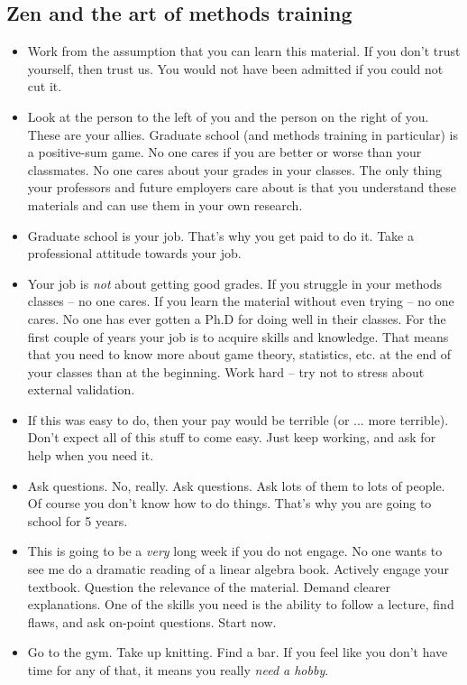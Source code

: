 \documentclass[12pt]{extarticle}
\newcommand{\bi}{\begin{itemize}}
\newcommand{\ei}{\end{itemize}}
\begin{document}
\subsection{Zen and the art of methods training}

\bi
\item Work from the assumption that you can learn this material.  If you
  don't trust yourself, then trust us.  You would not have been
  admitted if you could not cut it.  
\item Look at the person to the left of you and the person on the
  right of you.  These are your allies.  Graduate school (and methods
  training in particular) is a positive-sum game.  No one cares if you
  are better or worse than your classmates.  No one cares about your
  grades in your classes.  The only thing your professors and future
  employers care about is that you understand these materials and can
  use them in your own research.
\item Graduate school is your job.  That's why you get paid to do it.
  Take a professional attitude towards your job.    
\item Your job is \textit{not} about getting good grades.  If you
  struggle in your methods classes -- no one cares.  If you learn the
  material without even trying -- no one cares.  No one has ever
  gotten a Ph.D for doing well in their classes.  For the first couple
  of years your job is to acquire skills and knowledge.  That means
  that you need to know more about game theory, statistics, etc. at
  the end of your classes than at the beginning.  Work hard -- try not
  to stress about external validation.
\item If this was easy to do, then your pay would be terrible (or
  ... more terrible).  Don't expect all of this stuff to come easy.
  Just keep working, and ask for help when you need it.
\item Ask questions.  No, really.  Ask questions.  Ask lots of them
  to lots of people.  Of course you don't know how to do things.
  That's why you are going to school for 5 years.
\item This is going to be a \textit{very} long week if you do not
  engage.  No one wants to see me do a dramatic reading of a linear
  algebra book.  Actively engage your textbook.  Question the
  relevance of the material.  Demand clearer explanations.  One of the
  skills you need is the ability to follow a lecture, find flaws, and
  ask on-point questions.  Start now.
\item Go to the gym.  Take up knitting.  Find a bar.  If you feel like
  you don't have time for any of that, it means you really
  \textit{need a hobby}.  \ei
\end{document}
